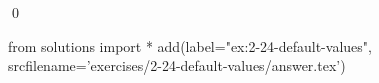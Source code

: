 
\begin{ex}
  \label{ex:2-24-default-values}
  
  \qed
\end{ex}
\begin{python0}
from solutions import *
add(label="ex:2-24-default-values",
    srcfilename='exercises/2-24-default-values/answer.tex')
\end{python0}
